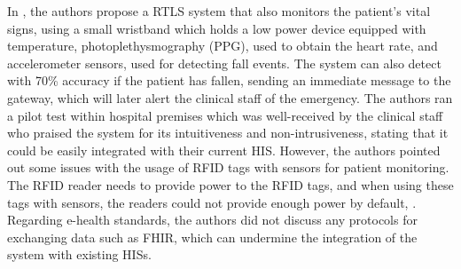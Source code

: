 % 

In \cite{Adame2018}, the authors propose a RTLS system that also monitors the patient's vital signs, using a small wristband which holds a low power device equipped with temperature, photoplethysmography (PPG), used to obtain the heart rate, and accelerometer sensors, used for detecting fall events. The system can also detect with 70\% accuracy if the patient has fallen, sending an immediate message to the gateway, which will later alert the clinical staff of the emergency. The authors ran a pilot test within hospital premises which was well-received by the clinical staff who praised the system for its intuitiveness and non-intrusiveness, stating that it could be easily integrated with their current \acs{HIS}. However, the authors pointed out some issues with the usage of \acs{RFID} tags with sensors for patient monitoring. The \acs{RFID} reader needs to provide power to the \acs{RFID} tags, and when using these tags with sensors, the readers could not provide enough power by default, . Regarding e-health standards, the authors did not discuss any protocols for exchanging data such as \acs{FHIR}, which can undermine the integration of the system with existing \acs{HIS}s.

%

